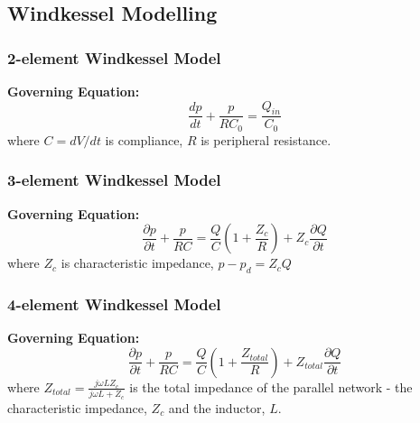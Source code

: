 \documentclass{article}
\begin{document}
\subsection{Windkessel Modelling}
\subsubsection{2-element Windkessel Model}
\begin{minipage}{0.5\textwidth}

\end{minipage}
\hfill
\begin{minipage}{0.5\textwidth}
\textbf{Governing Equation:}
\[\frac{dp}{dt} + \frac{p}{RC_{0}} = \frac{Q_{in}}{C_{0}}\]
where $C=dV/dt$ is compliance, $R$ is peripheral resistance.
\end{minipage}

\subsubsection{3-element Windkessel Model}
\begin{minipage}{0.5\textwidth}

\end{minipage}
\hfill
\begin{minipage}{0.5\textwidth}
\textbf{Governing Equation:}
\[\frac{\partial p}{\partial t}+\frac{p}{RC} = \frac{Q}{C}(1+\frac{Z_{c}}{R})+Z_{c}\frac{\partial Q}{\partial t}\]
where $Z_{c}$ is characteristic impedance, $p-p_{d} = Z_{c}Q$ 
\end{minipage}


\subsubsection{4-element Windkessel Model}
\begin{minipage}{0.5\textwidth}

\end{minipage}
\hfill
\begin{minipage}{0.5\textwidth}
\textbf{Governing Equation:}
\[\frac{\partial p}{\partial t}+\frac{p}{RC} = \frac{Q}{C}(1+\frac{Z_{total}}{R})+Z_{total}\frac{\partial Q}{\partial t}\]
where $\displaystyle Z_{total} = \frac{j\omega L Z_{c}}{j\omega L + Z_{c}}$ is the total impedance of the parallel network - the characteristic impedance, $Z_{c}$ and the inductor, $L$. 
\end{minipage}


\end{document}
